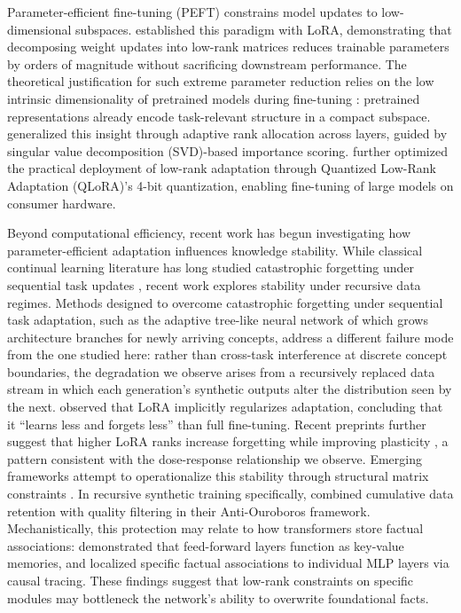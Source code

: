 \documentclass[a4paper,fleqn]{cas-dc}
\newif\ifshowchanges
\newcommand{\rev}[1]{\ifshowchanges{\color{blue}#1}\else{#1}\fi}
\newcommand{\revtwo}[1]{{\color{blue}#1}}
\begin{document}
Parameter-efficient fine-tuning (PEFT) constrains model updates to
low-dimensional subspaces. \citet{hu2022} established this paradigm with LoRA,
demonstrating that decomposing weight updates into low-rank matrices reduces
trainable parameters by orders of magnitude without sacrificing downstream
performance. The theoretical justification for such extreme parameter reduction
relies on the low intrinsic dimensionality of pretrained models during
fine-tuning \citep{aghajanyan2021}: pretrained representations already encode
task-relevant structure in a compact subspace. \citet{zhang2023adalora}
generalized this insight through adaptive rank allocation across layers, guided
by \rev{singular value decomposition (SVD)}-based importance scoring. \citet{dettmers2023} further optimized the
practical deployment of low-rank adaptation through \rev{Quantized Low-Rank Adaptation (QLoRA)}'s 4-bit quantization,
enabling fine-tuning of large models on consumer hardware.

Beyond computational efficiency, recent work has begun investigating how
parameter-efficient adaptation influences knowledge stability. While classical
continual learning literature has long studied catastrophic forgetting under
sequential task updates \citep{kirkpatrick2017,delange2022,shi2024continualllm}, recent work
explores stability under recursive data regimes.
\revtwo{Methods designed to overcome catastrophic forgetting under sequential task
adaptation, such as the adaptive tree-like neural network of \citet{wen2024}
which grows architecture branches for newly arriving concepts, address a
different failure mode from the one studied here: rather than cross-task
interference at discrete concept boundaries, the degradation we observe arises
from a recursively replaced data stream in which each generation's synthetic
outputs alter the distribution seen by the next.}
\citet{biderman2024} observed
that LoRA implicitly regularizes adaptation, concluding that it ``learns less
and forgets less'' than full fine-tuning. Recent preprints further suggest that
higher LoRA ranks increase forgetting while improving plasticity
\citep{soutifcormerais2024forgetting,ding2024ranktrade},
a pattern consistent with the dose-response relationship we observe. Emerging
frameworks attempt to operationalize this stability through structural matrix
constraints \citep{fawi2024curlora}. In
recursive synthetic training specifically, \citet{adapala2025} combined
cumulative data retention with quality filtering in their Anti-Ouroboros
framework. Mechanistically, this protection may relate to how transformers
store factual associations: \citet{geva2021} demonstrated that feed-forward
layers function as key-value memories, and \citet{meng2022locating} localized
specific factual associations to individual MLP layers via causal tracing. These
findings suggest that low-rank constraints on specific modules may bottleneck
the network's ability to overwrite foundational facts.
\end{document}
